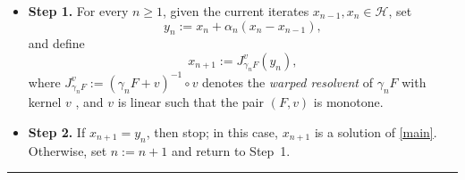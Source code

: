\documentclass[11pt]{article}
\theoremstyle{definition}
\theoremstyle{definition}
\theoremstyle{definition}
\newcommand{\Id}{\ensuremath{\operatorname{Id}}}
\begin{document}
\begin{itemize}
\item {\bf Step 1.} For every \(n \ge 1\), given the current iterates \(x_{n-1}, x_n \in \mathcal{H}\), set
\[
y_n := x_n + \alpha_n (x_n - x_{n-1}),
\]
and define
\begin{equation*}\label{mainal}
x_{n+1} := J_{\gamma_n F}^v(y_n),
\end{equation*}
where \(J_{\gamma_n F}^v := (\gamma_n F + v)^{-1} \circ v\) denotes the \emph{warped resolvent} of \(\gamma_n F\) with kernel \(v\) \cite{bc}, and  \(v\) is linear such that the pair \((F,v)\) is monotone.

\item {\bf Step 2.} If \(x_{n+1} = y_n\), then stop; in this case, \(x_{n+1}\) is a solution of \eqref{main}. Otherwise, set \(n := n+1\) and return to Step~1.

\end{itemize}

\medskip
\hrule
\vspace{2mm}

\medskip
%
%
\end{document}
